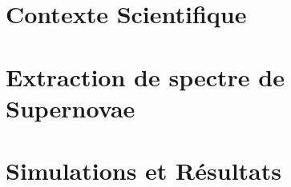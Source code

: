 \documentclass[a4paper, 12pt, final, garamond]{book}
\begin{document}
    
    
    
    
    \cleardoublepage
    \dominitoc
    \tableofcontents
    \listoffigures
    \listoftables
    
    \part{Contexte Scientifique}
    
    
    
    \part{Extraction de spectre de Supernovae}
    
    
    
    
    \part{Simulations et Résultats}
    
    
    
    
    
\end{document}
